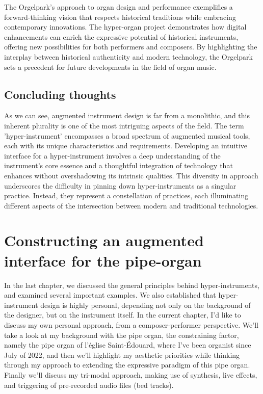 \documentclass[12pt,twoside,maitrise]{dms_ks}
\theoremstyle{definition}
\begin{document}
{The Orgelpark's approach to organ design and performance exemplifies a forward-thinking vision that respects historical traditions while embracing contemporary innovations. 
The hyper-organ project demonstrates how digital enhancements can enrich the expressive potential of historical instruments, offering new possibilities for both performers and composers. 
By highlighting the interplay between historical authenticity and modern technology, the Orgelpark sets a precedent for future developments in the field of organ music.

\section{Concluding thoughts}

As we can see, augmented instrument design is far from a monolithic, and this inherent plurality is one of the most intriguing aspects of the field.
The term 'hyper-instrument' encompasses a broad spectrum of augmented musical tools, each with its unique characteristics and requirements.
Developing an intuitive interface for a hyper-instrument involves a deep understanding of the instrument's core essence and a thoughtful integration of technology that enhances without overshadowing its intrinsic qualities.
This diversity in approach underscores the difficulty in pinning down hyper-instruments as a singular practice.
Instead, they represent a constellation of practices, each illuminating different aspects of the intersection between modern and traditional technologies.

\chapter{Constructing an augmented interface for the pipe-organ}

In the last chapter, we discussed the general principles behind hyper-instruments, and examined several important examples. 
We also established that hyper-instrument design is highly personal, depending not only on the background of the designer, but on the instrument itself. 
In the current chapter, I'd like to discuss my own personal approach, from a composer-performer perspective. We'll take a look at my background with the pipe organ, the constraining factor, namely the pipe organ of l'église Saint-Édouard, where I've been organist since July of 2022, and then we'll highlight my aesthetic priorities while thinking through my approach to extending the expressive paradigm of this pipe organ. Finally we'll discuss my tri-modal approach, making use of synthesis, live effects, and triggering of pre-recorded audio files (bed tracks). 

}
\end{document}
